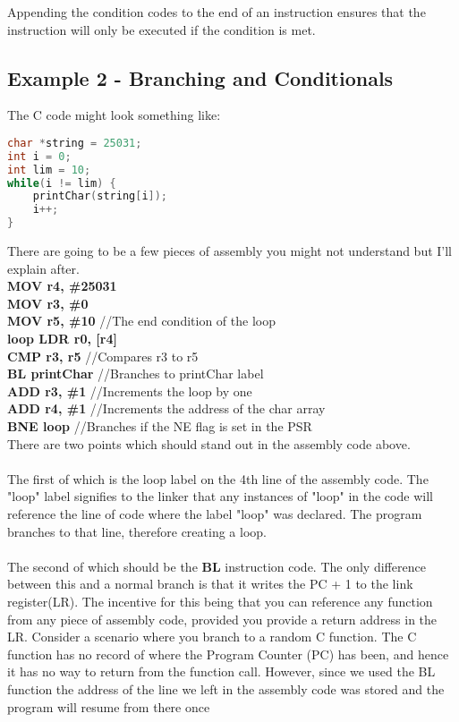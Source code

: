 \documentclass[10pt]{article}
\begin{document}
Appending the condition codes to the end of an instruction ensures that the instruction will only be executed if the condition is met.

\subsection{Example 2 - Branching and Conditionals}
The C code might look something like: 
\begin{lstlisting}[language={C}]
char *string = 25031; 
int i = 0; 
int lim = 10;
while(i != lim) { 
	printChar(string[i]); 
	i++; 
}	
\end{lstlisting}

There are going to be a few pieces of assembly you might not understand but I'll explain after. \\
\textbf{\indent \indent\indent MOV r4, \#25031} \\
\indent\indent\indent\textbf{MOV r3, \#0} \\
\indent\indent\indent\textbf{MOV r5, \#10} //The end condition of the loop\\
\textbf{loop    \indent    LDR r0, [r4]} \\
\indent\indent\indent\textbf{CMP r3, r5} //Compares r3 to r5\\
\indent\indent\indent\textbf{BL printChar} //Branches to printChar label \\
\indent\indent\indent\textbf{ADD r3, \#1} //Increments the loop by one \\
\indent\indent\indent\textbf{ADD r4, \#1} //Increments the address of the char array\\
\indent\indent\indent\textbf{BNE loop} //Branches if the NE flag is set in the PSR\\

There are two points which should stand out in the assembly code above. \\ \\ 
The first of which is the loop label on the 4th line of the assembly code. The "loop" label signifies to the linker that any instances of "loop" in the code will reference the line of code where the label "loop" was declared. The program branches to that line, therefore creating a loop. \\ \\
The second of which should be the \textbf{BL} instruction code. The only difference between this and a normal branch is that it writes the PC + 1 to the link register(LR). The incentive for this being that you can reference any function from any piece of assembly code, provided you provide a return address in the LR. Consider a scenario where you branch to a random C function. The C function has no record of where the Program Counter (PC) has been, and hence it has no way to return from the function call. However, since we used the BL function the address of the line we left in the assembly code was stored and the program will resume from there once \\
\end{document}
